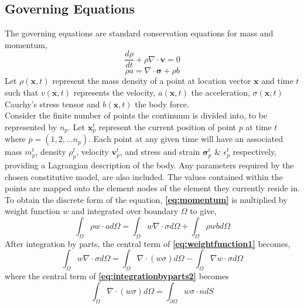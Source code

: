 \subsection{Governing Equations}
The governing equations are standard conservation equations for mass and momentum,
\begin{equation}
\frac{d\rho}{dt} + \rho\nabla\cdot \mathbf{v} = 0
\label{eq:mass}
\end{equation}
\begin{equation}
\rho a = \nabla\cdot\mathbf{\sigma} + \rho b
\label{eq:momentum}
\end{equation}
Let $\rho(\mathbf{x},t)$ represent the mass density of a point at location vector $\mathbf{x}$ and time $t$ such that $v(\mathbf{x},t)$ represents the velocity, $a(\mathbf{x},t)$ the acceleration, $\sigma(\mathbf{x},t)$ Cauchy's stress tensor and $b(\mathbf{x},t)$ the body force.\\
\newline
\noindent
Consider the finite number of points the continuum is divided into, to be represented by $n_p$. Let $\mathbf{x}_p^t$ represent the current position of point $p$ at time $t$ where $p=(1,2,...n_p)$. Each point at any given time will have an associated mass $m_p^t$, density $\rho_p^t$, velocity $\mathbf{v}_p^t$, and stress and strain $\mathbf{\sigma}_p^t$ \& $\epsilon_p^t$ respectively, providing a Lagrangian description of the body. Any parameters required by the chosen constitutive model, are also included. The values contained within the points are mapped onto the element nodes of the element they currently reside in.\\
\newline
\noindent
To obtain the discrete form of the equation, {\bfseries \ref{eq:momentum}} is multiplied by weight function $w$ and integrated over boundary $\Omega$ to give,
\begin{equation}
\int_\Omega \rho w \cdot ad\Omega = \int_\Omega w\nabla\cdot\sigma d\Omega + \int_\Omega \rho w b d\Omega
\label{eq:weightfunction1}
\end{equation}
After integration by parts, the central term of {\bfseries \ref{eq:weightfunction1}} becomes,
\begin{equation}
\int_\Omega w\nabla\cdot\sigma d\Omega= \int_\Omega\nabla\cdot (w\sigma) d\Omega- \int_\Omega \nabla w\cdot\sigma d\Omega
\label{eq:integrationbyparts2}
\end{equation}
where the central term of {\bfseries \ref{eq:integrationbyparts2}} becomes
\begin{equation}
\int_\Omega\nabla\cdot (w\sigma) d\Omega= \int_{\partial\Omega} w \sigma \cdot n dS
\label{eq:divergence}
\end{equation}
